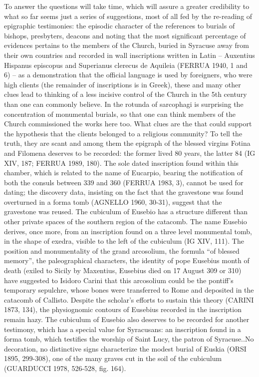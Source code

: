 \documentclass[amsthm,ebook]{saparticle}
\begin{document}
To answer the questions will take time, which will assure a greater credibility to what so far seems just a series of suggestions, most of all fed by the re-reading of epigraphic testimonies: the episodic character of the references to burials of bishops, presbyters, deacons and noting that the most significant percentage of evidences pertains to the members of the Church, buried in Syracuse away from their own countries and recorded in wall inscriptions written in Latin – Auxentius Hispanus episcopus and Superianus clerecus de Aquileia (FERRUA 1940, 1 and 6) – as a demonstration that the official language is used by foreigners, who were high clients (the remainder of inscriptions is in Greek), these and many other clues lead to thinking of a less incisive control of the Church in the 5th century than one can commonly believe.
In the rotunda of sarcophagi is surprising the concentration of monumental burials, so that one can think members of the Church commissioned the works here too. What clues are the that could support the hypothesis that the clients belonged to a religious community? To tell the truth, they are scant and among them the epigraph of the blessed virgins Fotina and Filomena deserves to be recorded: the former lived 80 years, the latter 84 (IG XIV, 187; FERRUA 1989, 180). The sole dated inscription found within this chamber, which is related to the name of Eucarpio, bearing the notification of both the consuls between 339 and 360 (FERRUA 1983, 3), cannot be used for dating; the discovery data, insisting on the fact that the gravestone was found overturned in a forma tomb (AGNELLO 1960, 30-31), suggest that the gravestone was reused.
The cubiculum of Eusebio has a structure different than other private spaces of the southern region of the catacomb. The name Eusebio derives, once more, from an inscription found on a three level monumental tomb, in the shape of exedra, visible to the left of the cubiculum (IG XIV, 111). The position and monumentality of the grand arcosolium, the formula “of blessed memory”, the paleographical characters, the identity of pope Eusebius month of death (exiled to Sicily by Maxentius, Eusebius died on 17 August 309 or 310) have suggested to Isidoro Carini that this arcosolium could be the pontiff’s temporary sepulchre, whose bones were transferred to Rome and deposited in the catacomb of Callisto. Despite the scholar’s efforts to sustain this theory (CARINI 1873, 134), the physiognomic contours of Eusebius recorded in the inscription remain hazy.
The cubiculum of Eusebio also deserves to be recorded for another testimony, which has a special value for Syracusans: an inscription found in a forma tomb, which testifies the worship of Saint Lucy, the patron of Syracuse..No decoration, no distinctive signs characterize the modest burial of Euskia (ORSI 1895, 299-308), one of the many graves cut in the soil of the cubiculum (GUARDUCCI 1978, 526-528, fig. 164).
\end{document}

